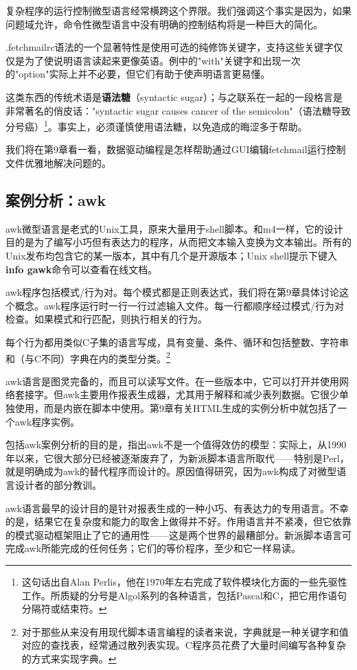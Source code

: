 \documentclass[12pt,oneside]{book}
\begin{document}
复杂程序的运行控制微型语言经常横跨这个界限。我们强调这个事实是因为，如果问题域允许，命令性微型语言中没有明确的控制结构将是一种巨大的简化。

.fetchmailrc语法的一个显著特性是使用可选的纯修饰关键字，支持这些关键字仅仅是为了使说明语言读起来更像英语。例中的"with"关键字和出现一次的"option"实际上并不必要，但它们有助于使声明语言更易懂。

这类东西的传统术语是\textbf{语法糖}（syntactic sugar）；与之联系在一起的一段格言是非常著名的俏皮话："syntactic sugar causes cancer of the semicolon"（语法糖导致分号癌）\footnote{这句话出自Alan Perlis，他在1970年左右完成了软件模块化方面的一些先驱性工作。所质疑的分号是Algol系列的各种语言，包括Pascal和C，把它用作语句分隔符或结束符。}。事实上，必须谨慎使用语法糖，以免造成的晦涩多于帮助。

我们将在第9章看一看，数据驱动编程是怎样帮助通过GUI编辑fetchmail运行控制文件优雅地解决问题的。

\subsection{案例分析：awk}
awk微型语言是老式的Unix工具，原来大量用于shell脚本。和m4一样，它的设计目的是为了编写小巧但有表达力的程序，从而把文本输入变换为文本输出。所有的Unix发布均包含它的某一版本，其中有几个是开源版本；Unix shell提示下键入\textbf{info gawk}命令可以查看在线文档。

awk程序包括模式/行为对。每个模式都是正则表达式，我们将在第9章具体讨论这个概念。awk程序运行时一行一行过滤输入文件。每一行都顺序经过模式/行为对检查。如果模式和行匹配，则执行相关的行为。

每个行为都用类似C子集的语言写成，具有变量、条件、循环和包括整数、字符串和（与C不同）字典在内的类型分类。\footnote{对于那些从来没有用现代脚本语言编程的读者来说，字典就是一种关键字和值对应的查找表，经常通过散列表实现。C程序员花费了大量时间编写各种复杂的方式来实现字典。}

awk语言是图灵完备的，而且可以读写文件。在一些版本中，它可以打开并使用网络套接字。但awk主要用作报表生成器，尤其用于解释和减少表列数据。它很少单独使用，而是内嵌在脚本中使用。第9章有关HTML生成的实例分析中就包括了一个awk程序实例。

包括awk案例分析的目的是，指出awk不是一个值得效仿的模型：实际上，从1990年以来，它很大部分已经被逐渐废弃了，为新派脚本语言所取代——特别是Perl，就是明确成为awk的替代程序而设计的。原因值得研究，因为awk构成了对微型语言设计者的部分教训。

awk语言最早的设计目的是针对报表生成的一种小巧、有表达力的专用语言。不幸的是，结果它在复杂度和能力的取舍上做得并不好。作用语言并不紧凑，但它依靠的模式驱动框架阻止了它的通用性——这是两个世界的最糟部分。新派脚本语言可完成awk所能完成的任何任务；它们的等价程序，至少和它一样易读。
\end{document}
